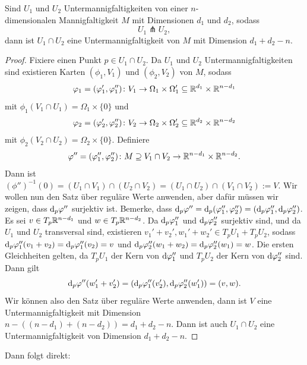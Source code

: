 \begin{prop}
    \label{prop: schnitt von transversalen untermannigfaltigkeiten}
    Sind $U_1$ und $U_2$ Untermannigfaltigkeiten von einer $n$-\\
    dimensionalen Mannigfaltigkeit $M$ mit 
    Dimensionen $d_1$ und $d_2$, sodass 
    \[ U_1 \pitchfork U_2 , \]
    dann ist $U_1 \cap U_2$ eine Untermannigfaltigkeit von $M$ mit Dimension $d_1 + d_2 - n$.
\end{prop}

\begin{proof}
    Fixiere einen Punkt $p \in U_1 \cap U_2$. Da $U_1$ und $U_2$ Untermannigfaltigkeiten sind existieren 
    Karten $(\phi_1, V_1)$ und $(\phi_2, V_2)$ von $M$, sodass 
    \[ \varphi_1 = (\varphi_1', \varphi_1'') \colon V_1 \to 
        \Omega_1 \times \Omega_1' \subseteq { \mathbb R }^{d_1} \times { \mathbb R }^{n - d_1} \]
    mit $\phi_1(V_1 \cap U_1) = \Omega_1 \times \{ 0 \}$ und 
    \[ \varphi_2 = (\varphi_2', \varphi_2'')\colon V_2 \to 
        \Omega_2 \times \Omega_2' \subseteq { \mathbb R }^{d_2} \times { \mathbb R }^{n - d_2} \]
    mit $\phi_2(V_2 \cap U_2) = \Omega_2 \times \{ 0 \}$. Definiere 
    \[ \varphi'' = (\varphi_1'', \varphi_2'') \colon 
        M \supseteq V_1 \cap V_2 \to { \mathbb R }^{n - d_1} \times { \mathbb R }^{n - d_2}. \]
    Dann ist 
    $(\phi'')^{-1}(0) = (U_1 \cap V_1) \cap (U_2 \cap V_2) = (U_1 \cap U_2) \cap (V_1 \cap V_2) := V$.
    Wir wollen nun den Satz über reguläre Werte anwenden, aber dafür müssen wir zeigen, dass 
    ${ \operatorname{d} }_p \varphi''$ surjektiv ist. Bemerke, dass 
    ${ \operatorname{d} }_p \varphi'' = { \operatorname{d} }_p (\varphi''_1, \varphi''_2) = ({ \operatorname{d} }_p \varphi''_1, { \operatorname{d} }_p \varphi''_2)$.
    Es sei $v \in T_p{ \mathbb R }^{n - d_1}$ und $w \in T_p{ \mathbb R }^{n - d_2}$. Da ${ \operatorname{d} }_p \varphi''_1$ und 
    ${ \operatorname{d} }_p \varphi''_2$ surjektiv sind, und da $U_1$ und $U_2$ transversal sind, 
    existieren $v_1' + v_2', w_1' + w_2' \in T_pU_1 + T_pU_2$, sodass 
    ${ \operatorname{d} }_p \varphi''_1 (v_1 + v_2) = { \operatorname{d} }_p \varphi''_1 (v_2) = v$ und 
    ${ \operatorname{d} }_p \varphi''_2 (w_1 + w_2) = { \operatorname{d} }_p \varphi''_2 (w_1) = w$.
    Die ersten Gleichheiten gelten, da $T_pU_1$ der Kern von ${ \operatorname{d} } \varphi''_1$ und 
    $T_pU_2$ der Kern von ${ \operatorname{d} } \varphi''_2$ sind. Dann gilt
    \[ { \operatorname{d} }_p \varphi'' (w_1' + v_2')  = ( { \operatorname{d} }_p \varphi''_1 (v_2'), { \operatorname{d} }_p \varphi''_2 (w_1')) = (v, w) . \]
    Wir können also den Satz über reguläre Werte anwenden, dann ist $V$ eine Untermannigfaltigkeit
    mit Dimension $n - ((n - d_1) + (n - d_2)) = d_1 + d_2 - n$. Dann ist auch $U_1 \cap U_2$
    eine Untermannigfaltigkeit von Dimension $d_1 + d_2 - n$.
\end{proof}

Dann folgt direkt:

